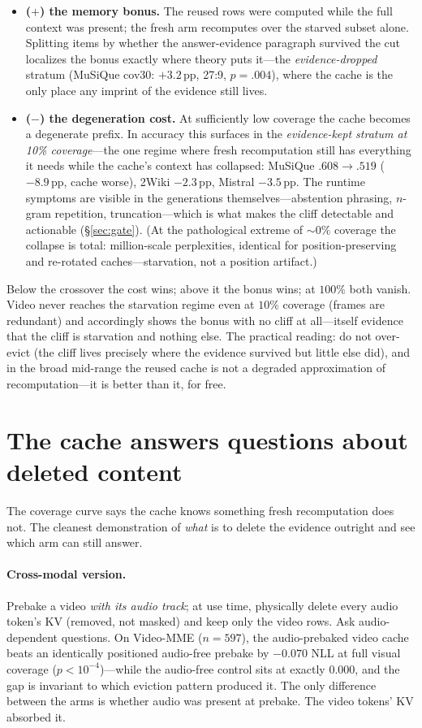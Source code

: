 \documentclass{article} %
\newcommand{\pp}{\,\mathrm{pp}}
\begin{document}
\begin{itemize}[leftmargin=2em]
\item \textbf{($+$) the memory bonus.} The reused rows were computed while the full context was present; the fresh arm recomputes over the starved subset alone. Splitting items by whether the answer-evidence paragraph survived the cut localizes the bonus exactly where theory puts it---the \emph{evidence-dropped} stratum (MuSiQue cov30: $+3.2\pp$, 27:9, $p{=}.004$), where the cache is the only place any imprint of the evidence still lives.
\item \textbf{($-$) the degeneration cost.} At sufficiently low coverage the cache becomes a degenerate prefix. In accuracy this surfaces in the \emph{evidence-kept stratum at 10\% coverage}---the one regime where fresh recomputation still has everything it needs while the cache's context has collapsed: MuSiQue $.608\rightarrow.519$ ($-8.9\pp$, cache worse), 2Wiki $-2.3\pp$, Mistral $-3.5\pp$. The runtime symptoms are visible in the generations themselves---abstention phrasing, $n$-gram repetition, truncation---which is what makes the cliff detectable and actionable (\S\ref{sec:gate}). (At the pathological extreme of ${\sim}0\%$ coverage the collapse is total: million-scale perplexities, identical for position-preserving and re-rotated caches---starvation, not a position artifact.)
\end{itemize}

Below the crossover the cost wins; above it the bonus wins; at $100\%$ both vanish. Video never reaches the starvation regime even at $10\%$ coverage (frames are redundant) and accordingly shows the bonus with no cliff at all---itself evidence that the cliff is starvation and nothing else. The practical reading: do not over-evict (the cliff lives precisely where the evidence survived but little else did), and in the broad mid-range the reused cache is not a degraded approximation of recomputation---it is better than it, for free.

\section{The cache answers questions about deleted content}
\label{sec:dropgold}

The coverage curve says the cache knows something fresh recomputation does not. The cleanest demonstration of \emph{what} is to delete the evidence outright and see which arm can still answer.

\paragraph{Cross-modal version.}
Prebake a video \emph{with its audio track}; at use time, physically delete every audio token's KV (removed, not masked) and keep only the video rows. Ask audio-dependent questions. On Video-MME ($n=597$), the audio-prebaked video cache beats an identically positioned audio-free prebake by $-0.070$ NLL at full visual coverage ($p<10^{-4}$)---while the audio-free control sits at exactly $0.000$, and the gap is invariant to which eviction pattern produced it. The only difference between the arms is whether audio was present at prebake. The video tokens' KV absorbed it.
\end{document}
